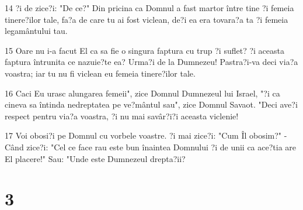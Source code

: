 \par 14 ?i de zice?i: "De ce?" Din pricina ca Domnul a fast martor între tine ?i femeia tinere?ilor tale, fa?a de care tu ai fost viclean, de?i ea era tovara?a ta ?i femeia legamântului tau.
\par 15 Oare nu i-a facut El ca sa fie o singura faptura cu trup ?i suflet? ?i aceasta faptura întrunita ce nazuie?te ea? Urma?i de la Dumnezeu! Pastra?i-va deci via?a voastra; iar tu nu fi viclean eu femeia tinere?ilor tale.
\par 16 Caci Eu urasc alungarea femeii", zice Domnul Dumnezeul lui Israel, "?i ca cineva sa întinda nedreptatea pe ve?mântul sau", zice Domnul Savaot. "Deci ave?i respect pentru via?a voastra, ?i nu mai savâr?i?i aceasta viclenie!
\par 17 Voi obosi?i pe Domnul cu vorbele voastre. ?i mai zice?i: "Cum Îl obosim?" - Când zice?i: "Cel ce face rau este bun înaintea Domnului ?i de unii ca ace?tia are El placere!" Sau: "Unde este Dumnezeul drepta?ii?

\chapter{3}

